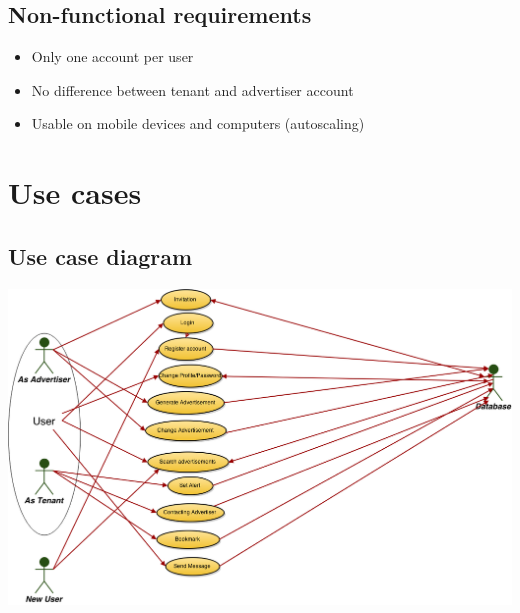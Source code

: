 \documentclass[a4paper,11pt]{article}
\begin{document}
\subsection*{Non-functional requirements}
\begin{itemize}
  \item Only one account per user
  \item No difference between tenant and advertiser account
  \item Usable on mobile devices and computers (autoscaling)
\end{itemize}

\section{Use cases}
\subsection*{Use case diagram}
\begin{center}
	\includegraphics[width=400bp]{UseCases.png}
\end{center}
\end{document}
